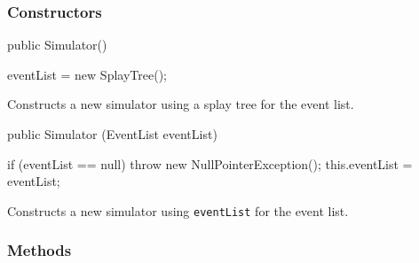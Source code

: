 \subsubsection*{Constructors}
\begin{code}

   public Simulator()\begin{hide} {
     eventList  = new SplayTree();
   }\end{hide}
\end{code}
\begin{tabb}  Constructs a new simulator using a splay tree for the
  event list.
\end{tabb}
\begin{code}

   public Simulator (EventList eventList)\begin{hide} {
     if (eventList == null)
        throw new NullPointerException();
     this.eventList = eventList;
   }\end{hide}
\end{code}
\begin{tabb}  Constructs a new simulator using \texttt{eventList} for
  the event list.
\end{tabb}
\subsubsection* {Methods}

